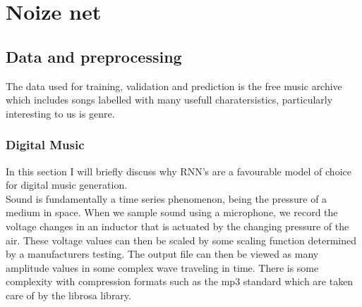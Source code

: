 \documentclass{article}
\begin{document}
\section{Noize net}
\label{sec:nn}
\subsection{Data and preprocessing}
The data used for training, validation and prediction is the free music archive which includes songs labelled with many usefull charatersistics, particularly interesting to us is genre.  \cite{fma_dataset}
\cite{fma_challenge}
\subsubsection{Digital Music}
In this section I will briefly discuss why RNN's are a favourable model of choice for digital music generation. \\
Sound is fundamentally a time series phenomenon, being the pressure of a medium in space. When we sample sound using a microphone, we record the voltage changes in an inductor that is actuated by the changing pressure of the air. These voltage values can then be scaled by some scaling function determined by a manufacturers testing. The output file can then be viewed as many amplitude values in some complex wave traveling in time. There is some complexity with compression formats such as the mp3 standard which are taken care of by the librosa library. \cite{isoMP3}
\end{document}
